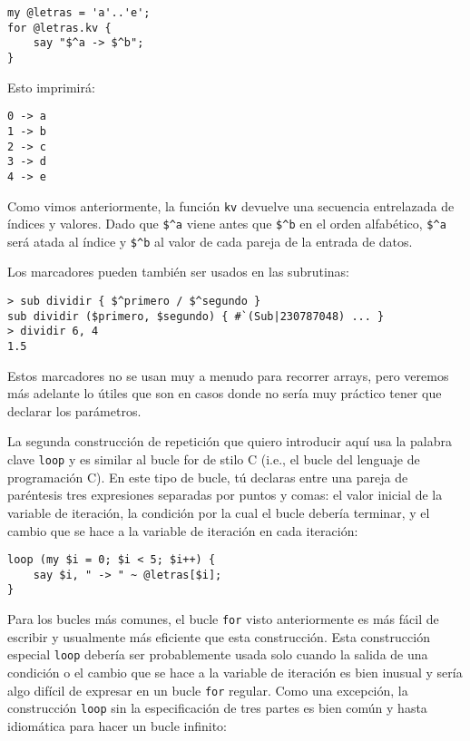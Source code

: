 \begin{lstlisting}
my @letras = 'a'..'e';
for @letras.kv { 
    say "$^a -> $^b"; 
}
\end{lstlisting}
%
Esto imprimirá:
\begin{lstlisting}
0 -> a
1 -> b
2 -> c
3 -> d
4 -> e
\end{lstlisting}
%

Como vimos anteriormente, la función {\tt kv} devuelve
una secuencia entrelazada de índices y valores. Dado
que \verb|$^a| viene antes que \verb|$^b| en el orden
alfabético, \verb|$^a| será atada al índice y \verb|$^b|
al valor de cada pareja de la entrada de datos.

Los marcadores pueden también ser usados en las
subrutinas:

\begin{lstlisting}
> sub dividir { $^primero / $^segundo }
sub dividir ($primero, $segundo) { #`(Sub|230787048) ... }
> dividir 6, 4
1.5
\end{lstlisting}
%

Estos marcadores no se usan muy a menudo para recorrer arrays,
pero veremos más adelante lo útiles
que son en casos donde no sería muy práctico tener que declarar los
parámetros.

\label{C-style loop}
La segunda construcción de repetición que quiero introducir
aquí usa la palabra clave {\tt loop} y es similar
al bucle for de stilo C (i.e., el bucle del lenguaje
de programación C). En este tipo de bucle, tú declaras
entre una pareja de paréntesis tres expresiones separadas
por puntos y comas: el valor inicial de la variable de iteración,
la condición por la cual el bucle debería terminar, y el cambio
que se hace a la variable de iteración en cada iteración:

\begin{lstlisting}
loop (my $i = 0; $i < 5; $i++) {
    say $i, " -> " ~ @letras[$i];
}
\end{lstlisting}
%
Para los bucles más comunes, el bucle {\tt for} visto anteriormente
es más fácil de escribir y usualmente más eficiente que esta
construcción. Esta construcción especial {\tt loop} debería 
ser probablemente usada solo cuando la salida de una condición
o el cambio que se hace a la variable de iteración es bien inusual
y sería algo difícil de expresar en un bucle {\tt for} regular. 
Como una excepción, la construcción {\tt loop} sin la especificación
de tres partes es bien común  y hasta idiomática para hacer un bucle
infinito:

